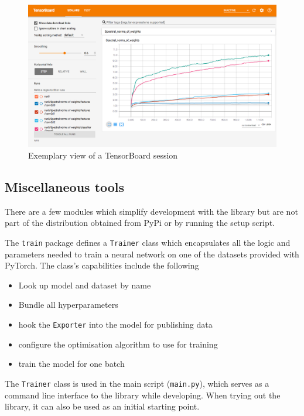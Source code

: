 \begin{figure}
    \hypertarget{fig:example_tb}{%
        \centering
        \includegraphics[width=\textwidth]{gfx/diagrams/software_screens/example_tb.png}
        \caption{Exemplary view of a TensorBoard session}\label{fig:example_tb}
    }
\end{figure}

\hypertarget{sec:other-tools}{%
\subsection{Miscellaneous tools}\label{sec:other-tools}}

There are a few modules which simplify development with the library but are not
part of the distribution obtained from PyPi or by running the setup script.

The \texttt{train} package defines a \texttt{Trainer} class which encapsulates
all the logic and parameters needed to train a neural network on one of the
datasets provided with PyTorch. The class's capabilities include the following

\begin{itemize}
    \item
        Look up model and dataset by name
    \item
        Bundle all hyperparameters
    \item
        hook the \texttt{Exporter} into the model for
        publishing data
    \item
        configure the optimisation algorithm to use for training
    \item
        train the model for one batch
\end{itemize}

The \texttt{Trainer} class is used in the main script (\texttt{main.py}), which
serves as a command line interface to the library while developing. When trying
out the library, it can also be used as an initial starting point.

